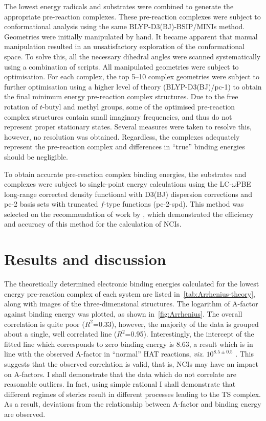 The lowest energy radicals and substrates were combined to generate the appropriate pre-reaction complexes. These pre-reaction complexes were subject to conformational analysis using the same BLYP-D3(BJ)-BSIP/MINIs method. Geometries were initially manipulated by hand. It became apparent that manual manipulation resulted in an unsatisfactory exploration of the conformational space. To solve this, all the necessary dihedral angles were scanned systematically using a combination of scripts.\cite{note5} All manipulated geometries were subject to optimisation. For each complex, the top 5--10 complex geometries were subject to further optimisation using a higher level of theory (BLYP-D3(BJ)/pc-1) to obtain the final minimum energy pre-reaction complex structures. Due to the free rotation of $t$-butyl and methyl groups, some of the optimised pre-reaction complex structures contain small imaginary frequencies, and thus do not represent proper stationary states. Several measures were taken to resolve this, however, no resolution was obtained. Regardless, the complexes adequately represent the pre-reaction complex and differences in ``true'' binding energies should be negligible.

To obtain accurate pre-reaction complex binding energies, the substrates and complexes were subject to single-point energy calculations using the LC-$\omega$PBE long-range corrected density functional\cite{Vydrov2006,Vydrov2006a} with D3(BJ) dispersion corrections and pc-2 basis sets with truncated $f$-type functions (pc-2-spd).\cite{Johnson2013} This method was selected on the recommendation of work by \citet{Johnson2013}, which demonstrated the efficiency and accuracy of this method for the calculation of NCIs.

\section{Results and discussion}

The theoretically determined electronic binding energies calculated for the lowest energy pre-reaction complex of each system are listed in~\ref{tab:Arrhenius-theory}, along with images of the three-dimensional structures. The logarithm of A-factor against binding energy was plotted, as shown in~\ref{fig:Arrhenius}. The overall correlation is quite poor ($R^2$=0.33), however, the majority of the data is grouped about a single, well correlated line ($R^2$=0.95). Interestingly, the intercept of the fitted line which corresponds to zero binding energy is 8.63, a result which is in line with the observed A-factor in ``normal'' HAT reactions, \emph{viz. }$10^{8.5\pm0.5}$ \Ms.\cite{Benson1976} This suggests that the observed correlation is valid, that is, NCIs may have an impact on A-factors. I shall demonstrate that the data which do not correlate are reasonable outliers. In fact, using simple rational I shall demonstrate that different regimes of sterics result in different processes leading to the TS complex. As a result, deviations from the relationship between A-factor and binding energy are observed.


